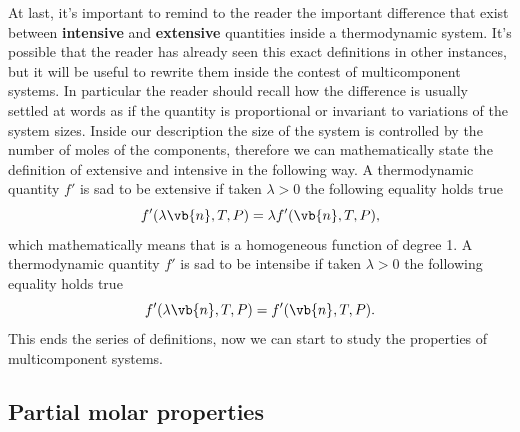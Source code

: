At last, it's important to remind to the reader the important difference that exist between \textbf{intensive} and \textbf{extensive} quantities inside a thermodynamic system. It's possible that the reader has already seen this exact definitions in other instances, but it will be useful to rewrite them inside the contest of multicomponent systems. In particular the reader should recall how the difference is usually settled at words as if the quantity is proportional or invariant to variations of the system sizes. Inside our description the size of the system is controlled by the number of moles of the components, therefore we can mathematically state the definition of extensive and intensive in the following way.
{
    A thermodynamic quantity $f'$ is sad to be extensive if taken $\lambda > 0$ the following equality holds true
    \begin{equation}
        f'(\lambda\vb{n}, T, P) = \lambda f'(\vb{n}, T, P),
    \end{equation}
    which mathematically means that is a homogeneous function of degree 1.
}
{
    A thermodynamic quantity $f'$ is sad to be intensibe if taken $\lambda > 0$ the following equality holds true
    \begin{equation}
        f'(\lambda\vb{n}, T, P) = f'(\vb{n}, T, P).
    \end{equation}
}
\noindent
This ends the series of definitions, now we can start to study the properties of multicomponent systems.



\subsection{Partial molar properties}



